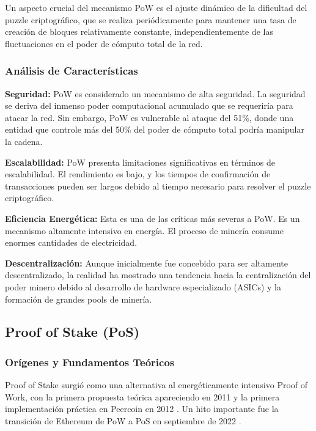 \documentclass[spanish,12pt,letterpaper]{report}
\begin{document}
Un aspecto crucial del mecanismo PoW es el ajuste dinámico de la dificultad del puzzle criptográfico, que se realiza periódicamente para mantener una tasa de creación de bloques relativamente constante, independientemente de las fluctuaciones en el poder de cómputo total de la red.

\subsubsection{Análisis de Características}

\textbf{Seguridad:} PoW es considerado un mecanismo de alta seguridad. La seguridad se deriva del inmenso poder computacional acumulado que se requeriría para atacar la red. Sin embargo, PoW es vulnerable al ataque del 51\%, donde una entidad que controle más del 50\% del poder de cómputo total podría manipular la cadena.

\textbf{Escalabilidad:} PoW presenta limitaciones significativas en términos de escalabilidad. El rendimiento es bajo, y los tiempos de confirmación de transacciones pueden ser largos debido al tiempo necesario para resolver el puzzle criptográfico.

\textbf{Eficiencia Energética:} Esta es una de las críticas más severas a PoW. Es un mecanismo altamente intensivo en energía. El proceso de minería consume enormes cantidades de electricidad.

\textbf{Descentralización:} Aunque inicialmente fue concebido para ser altamente descentralizado, la realidad ha mostrado una tendencia hacia la centralización del poder minero debido al desarrollo de hardware especializado (ASICs) y la formación de grandes pools de minería.

\subsection{Proof of Stake (PoS)}

\subsubsection{Orígenes y Fundamentos Teóricos}

Proof of Stake surgió como una alternativa al energéticamente intensivo Proof of Work, con la primera propuesta teórica apareciendo en 2011 y la primera implementación práctica en Peercoin en 2012 \parencite{itm2025pos}. Un hito importante fue la transición de Ethereum de PoW a PoS en septiembre de 2022 \parencite{ethereum2022merge}.
\end{document}
